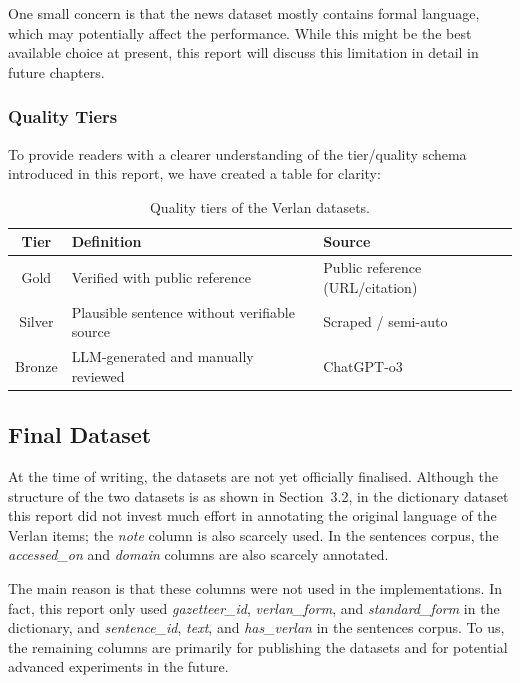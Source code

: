 \documentclass[12pt]{article}
\begin{document}
One small concern is that the news dataset mostly contains formal language, which may potentially affect the performance. While this might be the best available choice at present, this report will discuss this limitation in detail in future chapters.

\subsubsection{Quality Tiers}

To provide readers with a clearer understanding of the tier/quality schema introduced in this report, we have created a table for clarity:

\begin{table}[H]
\centering
\caption{Quality tiers of the Verlan datasets.}
\begin{tabular}{c|l|l}
\hline
\textbf{Tier} & \textbf{Definition} & \textbf{Source} \\
\hline
Gold   & Verified with public reference & Public reference (URL/citation) \\
Silver & Plausible sentence without verifiable source & Scraped / semi-auto \\
Bronze & LLM-generated and manually reviewed & ChatGPT-o3 \\
\hline
\end{tabular}
\label{tab:verlan_tiers}
\end{table}


\subsection{Final Dataset}

At the time of writing, the datasets are not yet officially finalised. Although the structure of the two datasets is as shown in Section~3.2, in the dictionary dataset this report did not invest much effort in annotating the original language of the Verlan items; the \textit{note} column is also scarcely used. In the sentences corpus, the \textit{accessed\_on} and \textit{domain} columns are also scarcely annotated. 

The main reason is that these columns were not used in the implementations. In fact, this report only used \textit{gazetteer\_id}, \textit{verlan\_form}, and \textit{standard\_form} in the dictionary, and \textit{sentence\_id}, \textit{text}, and \textit{has\_verlan} in the sentences corpus. To us, the remaining columns are primarily for publishing the datasets and for potential advanced experiments in the future.
\end{document}
